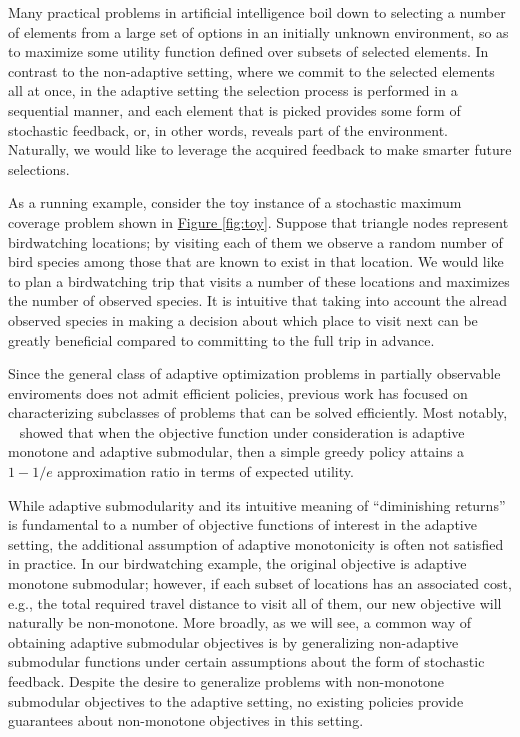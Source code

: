 \documentclass{article}
\newcommand{\figref}[1]{\hyperref[#1]{Figure \ref*{#1}}}
\newcommand{\citet}[1]{\citeauthor{#1}~\shortcite{#1}}
\begin{document}
Many practical problems in artificial intelligence boil down to selecting a number of elements from a large set of options in an initially unknown environment, so as to maximize some utility function defined over subsets of selected elements.
In contrast to the non-adaptive setting, where we commit to the selected elements all at once, in the adaptive setting the selection process is performed in a sequential manner, and each element that is picked provides some form of stochastic feedback, or, in other words, reveals part of the environment.
Naturally, we would like to leverage the acquired feedback to make smarter future selections.

As a running example, consider the toy instance of a stochastic maximum coverage problem shown in \figref{fig:toy}.
Suppose that triangle nodes represent birdwatching locations; by visiting each of them we observe a random number of bird species among those that are known to exist in that location.
We would like to plan a birdwatching trip that visits a number of these locations and maximizes the number of observed species.
It is intuitive that taking into account the alread observed species in making a decision about which place to visit next can be greatly beneficial compared to committing to the full trip in advance.

Since the general class of adaptive optimization problems in partially observable enviroments does not admit efficient policies, previous work has focused on characterizing subclasses of problems that can be solved efficiently.
Most notably, \citet{golovin11} showed that when the objective function under consideration is adaptive monotone and adaptive submodular, then a simple greedy policy attains a $1-1/e$ approximation ratio in terms of expected utility.

While adaptive submodularity and its intuitive meaning of ``diminishing returns'' is fundamental to a number of objective functions of interest in the adaptive setting, the additional assumption of adaptive monotonicity is often not satisfied in practice.
In our birdwatching example, the original objective is adaptive monotone submodular; however, if each subset of locations has an associated cost, e.g., the total required travel distance to visit all of them, our new objective will naturally be non-monotone.
More broadly, as we will see, a common way of obtaining adaptive submodular objectives is by generalizing non-adaptive submodular functions under certain assumptions about the form of stochastic feedback.
Despite the desire to generalize problems with non-monotone submodular objectives to the adaptive setting, no existing policies provide guarantees about non-monotone objectives in this setting.
\end{document}
